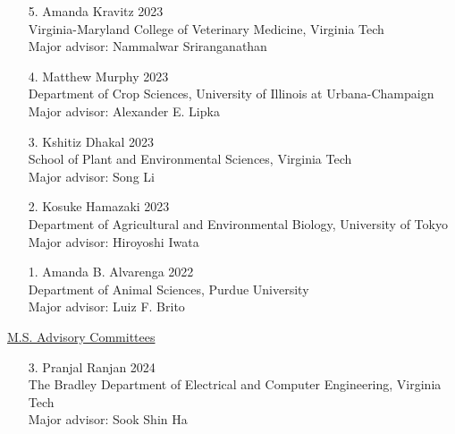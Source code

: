 \documentclass[margin,line,10pt]{res}
\begin{document}
\begin{resume}
\begin{enumerate}
  \vspace{0.3cm}

  \item [5.] Amanda Kravitz  \hfill 2023 \\
  Virginia-Maryland College of Veterinary Medicine,  Virginia Tech \\ 
  Major advisor: Nammalwar Sriranganathan

  \vspace{0.3cm}

  \item [4.] Matthew Murphy \hfill 2023 \\
  Department of Crop Sciences, University of Illinois at Urbana-Champaign \\
  Major advisor: Alexander E. Lipka 

  \vspace{0.3cm}

  \item [3.] Kshitiz Dhakal \hfill 2023 \\
  School of Plant and Environmental Sciences,  Virginia Tech \\
  Major advisor: Song Li

  \vspace{0.3cm}

  \item [2.] Kosuke Hamazaki \hfill 2023 \\
  Department of Agricultural and Environmental Biology,  University of Tokyo \\ 
  Major advisor: Hiroyoshi Iwata

  \vspace{0.3cm}

\item [1.] Amanda B. Alvarenga   \hfill 2022\\
  Department of Animal Sciences, Purdue University \\
  Major advisor: Luiz F. Brito
\end{enumerate}


\begin{flushleft}
\hspace{0.2cm} \underline{M.S. Advisory Committees}
\end{flushleft}



\begin{enumerate}

  \item [3.] Pranjal Ranjan  \hfill 2024 \\
  The Bradley Department of Electrical and Computer Engineering,  Virginia Tech \\
  Major advisor: Sook Shin Ha
  \vspace{0.3cm}


\end{enumerate}
\end{resume}
\end{document}
